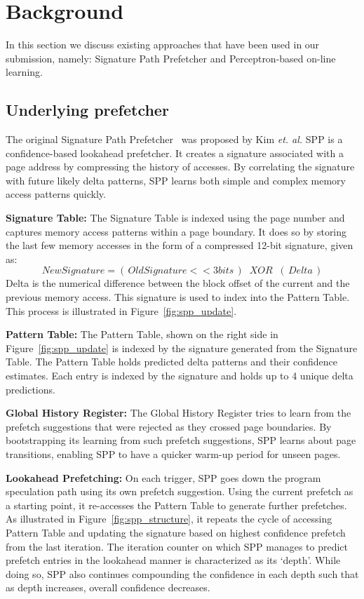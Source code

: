 \section{Background}
\label{Background}
In this section we discuss existing approaches that have been used in our
submission, namely: Signature Path Prefetcher and Perceptron-based on-line
learning.

\subsection{Underlying prefetcher}
\label{sec:Background-SPP}
The original Signature Path Prefetcher~\cite{SPP} was proposed by Kim {\em et.
al.} SPP is a confidence-based lookahead prefetcher.  It creates a signature
associated with a page address by compressing the history of accesses. By
correlating the signature with future likely delta patterns, SPP learns both
simple and complex memory access patterns quickly.

\noindent \textbf{Signature Table:} 
The Signature Table is indexed using the page number and captures memory 
access patterns within a page boundary. It does so by storing the last few
memory accesses in the form of a compressed 12-bit signature, given as:
$$New Signature = (\,Old Signature << 3 bits\,) \;\;XOR\;\; (\,Delta\,)$$ 
Delta is the numerical difference between the block offset of the current 
and the previous memory access. This signature is used to index into the 
Pattern Table. This process is illustrated in Figure~\ref{fig:spp_update}.

\noindent \textbf{Pattern Table:} 
The Pattern Table, shown on the right side in Figure~\ref{fig:spp_update} 
is indexed by the signature generated from the Signature Table. The Pattern 
Table holds predicted delta patterns and their confidence estimates. Each 
entry is indexed by the signature and holds up to 4 unique delta predictions.

\noindent \textbf{Global History Register:} 
The Global History Register tries to learn from the prefetch suggestions that
were rejected as they crossed page boundaries. By bootstrapping its learning
from such prefetch suggestions, SPP learns about page transitions, enabling
SPP to have a quicker warm-up period for unseen pages.


\noindent \textbf{Lookahead Prefetching:} On each trigger, SPP goes
down the program speculation path using its own prefetch suggestion.
Using the current prefetch as a starting point, it re-accesses the Pattern
Table to generate further prefetches. As illustrated in
Figure~\ref{fig:spp_structure}, it repeats the cycle of accessing
Pattern Table and updating the signature based on highest confidence
prefetch from the last iteration. The iteration counter on which SPP
manages to predict prefetch entries in the lookahead manner is
characterized as its `depth'. While doing so, SPP also continues
compounding the confidence in each depth such that as depth increases,
overall confidence decreases.

